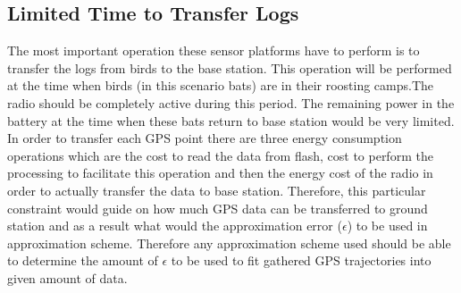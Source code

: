 \documentclass[conference]{IEEEtran}
\begin{document}
\subsection{Limited Time to Transfer Logs} \label{limited-time}
The most important operation these sensor platforms have to perform is to transfer the logs from birds to the base station. This operation will be performed at the time when birds (in this scenario bats) are in their roosting camps.The radio should be completely active during this period. The remaining power in the battery at the time when these bats return to base station would be very limited. In order to transfer each GPS point there are three energy consumption operations which are the cost to read the data from flash, cost to perform the processing to facilitate this operation and then the energy cost of the radio in order to actually transfer the data to base station. Therefore, this particular constraint would guide on how much GPS data can be transferred to ground station and as a result what would the approximation error ($\epsilon$) to be used in approximation scheme. Therefore any approximation scheme used should be able to determine the amount of $\epsilon$ to be used to fit gathered GPS trajectories into given amount of data.\
%
%
\end{document}
